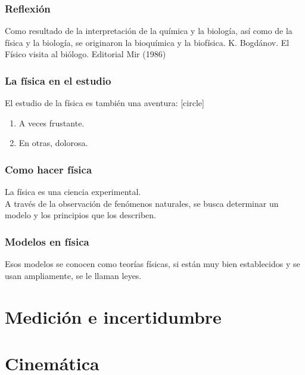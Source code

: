 \begin{frame}
\frametitle{Reflexión}
Como resultado de la interpretación de la química y la biología, así como de la física y la biología, se originaron la bioquímica y la biofísica.
\pause
\vfill
K. Bogdánov. El Físico visita al biólogo. Editorial Mir (1986)
\end{frame}
\begin{frame}
\frametitle{La física en el estudio}
El estudio de la física es también una aventura:
\pause
{}
[circle]
\begin{enumerate}[<+->]
\item A veces frustante.
\item En otras, dolorosa.
\end{enumerate}
\end{frame}
\begin{frame}
\frametitle{Como hacer física}
La física es una ciencia experimental.
\\
\bigskip
A través de la observación de fenómenos naturales, se busca determinar un modelo y los principios que los describen.
\end{frame}
\begin{frame}   
\frametitle{Modelos en física}
Esos modelos se conocen como teorías físicas, si están muy bien establecidos y se usan ampliamente, se le llaman leyes.
\\
\bigskip
\end{frame}
\section{Medición e incertidumbre}
\begin{frame}

\end{frame}
\section{Cinemática}
\begin{frame}

\end{frame}


